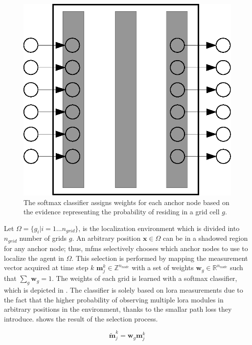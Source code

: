     \begin{figure}[thpb]
       \centering
       \includegraphics[width=\linewidth]{figures/softmax.eps}
       \caption{\label{fig:softmax}The softmax classifier assigns weights for each anchor node based on the evidence representing the probability of residing in a grid cell $g$.}
    \end{figure}

    Let $\Omega=\{g_i | i=1\ldots n_{grid}\}$, is the localization environment which is divided into $n_{grid}$ number of grids $g$.
    An arbitrary position $\bm{x} \in \Omega$ can be in a shadowed region for any anchor node; thus, \gls{mfms} selectively chooses which anchor nodes to use to localize the agent in $\Omega$.
    This selection is performed by mapping the measurement vector acquired at time step $k$ $\bm{m}^{k}_j \in \mathbb{Z}^{n_{node}}$ with a set of weights $\bm{w}_g \in \mathbb{R}^{n_{node}}$ such that $\sum_g \bm{w}_g = 1$.
    The weights of each grid is learned with a softmax classifier, which is depicted in .
    The classifier is solely based on \gls{lora} measurements due to the fact that the higher probability of observing multiple \gls{lora} modules in arbitrary positions in the environment, thanks to the smallar path loss they introduce.
     shows the result of the selection process.

    \begin{equation}
        \label{eq:weighted_m}
        \bm{\widetilde{m}}^{k}_j = \bm{w}_g \bm{m}^{k}_j
    \end{equation}

